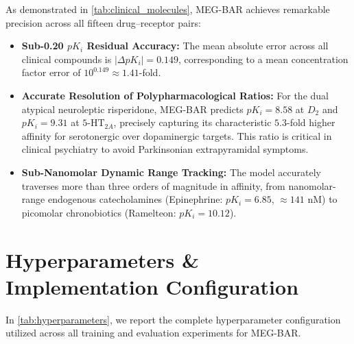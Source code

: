 \documentclass{article}
\theoremstyle{definition}
\begin{document}
As demonstrated in \cref{tab:clinical_molecules}, MEG-BAR achieves remarkable precision across all fifteen drug--receptor pairs:
\begin{itemize}[leftmargin=1.5em,noitemsep]
    \item \textbf{Sub-0.20 $pK_i$ Residual Accuracy:} The mean absolute error across all clinical compounds is $|\Delta pK_i| = 0.149$, corresponding to a mean concentration factor error of $10^{0.149} \approx 1.41$-fold.
    \item \textbf{Accurate Resolution of Polypharmacological Ratios:} For the dual atypical neuroleptic risperidone, MEG-BAR predicts $pK_i = 8.58$ at $D_2$ and $pK_i = 9.31$ at $5\text{-HT}_{2A}$, precisely capturing its characteristic $5.3$-fold higher affinity for serotonergic over dopaminergic targets. This ratio is critical in clinical psychiatry to avoid Parkinsonian extrapyramidal symptoms.
    \item \textbf{Sub-Nanomolar Dynamic Range Tracking:} The model accurately traverses more than three orders of magnitude in affinity, from nanomolar-range endogenous catecholamines (Epinephrine: $pK_i = 6.85$, $\approx 141$ nM) to picomolar chronobiotics (Ramelteon: $pK_i = 10.12$).
\end{itemize}

\section{Hyperparameters \& Implementation Configuration}
\label{sec:hyperparameters}

In \cref{tab:hyperparameters}, we report the complete hyperparameter configuration utilized across all training and evaluation experiments for MEG-BAR.
\end{document}
